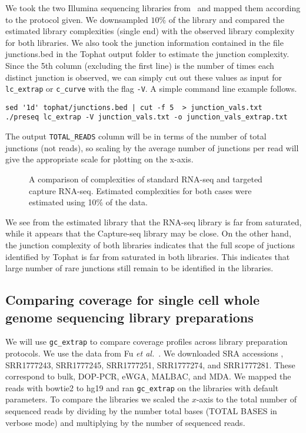 \documentclass[11pt, titlepage]{article}
\newcommand{\fn}[1]{\texttt{#1}}
\begin{document}
We took the two Illumina sequencing libraries
from~\cite{mercer2011targeted} and mapped them according to the
protocol given.  We downsampled $10 \%$ of the library and compared
the estimated library complexities (single end) with the observed
library complexity for both libraries.  We also took the junction
information contained in the file junctions.bed in the Tophat output
folder to estimate the junction complexity.  Since the 5th column
(excluding the first line) is the number of times each distinct
junction is observed, we can simply cut out these values as input for
\fn{lc\_extrap} or \fn{c\_curve} with the flag \fn{-V}.  A simple
command line example follows.
\begin{verbatim}
sed '1d' tophat/junctions.bed | cut -f 5  > junction_vals.txt
./preseq lc_extrap -V junction_vals.txt -o junction_vals_extrap.txt
\end{verbatim}
The output \fn{TOTAL\_READS} column will be in terms of the number of
total junctions (not reads), so scaling by the average number of
junctions per read will give the appropriate scale for plotting on the
x-axis.

\begin{figure}[h!]
\caption{A comparison of complexities of standard RNA-seq and
targeted capture RNA-seq.  Estimated complexities for both cases were
estimated using 10\% of the data.}
\end{figure}

We see from the estimated library that the RNA-seq library is far from
saturated, while it appears that the Capture-seq library may be close.
On the other hand, the junction complexity of both libraries indicates
that the full scope of juctions identified by Tophat is far from
saturated in both libraries.  This indicates that large number of rare
junctions still remain to be identified in the libraries.


\newpage

\subsection*{Comparing coverage for single cell whole genome sequencing library preparations}

We will use \fn{gc\_extrap} to compare coverage profiles across
library preparation protocols.  We use the data from Fu {\em et
  al.}~\cite{fu2015uniform}.  We downloaded SRA accessions ,
SRR1777243, SRR1777245, SRR1777251, SRR1777274, and SRR1777281.  These
correspond to bulk, DOP-PCR, eWGA, MALBAC, and MDA.  We mapped the
reads with bowtie2 to hg19 and ran \fn{gc\_extrap} on the libraries
with default parameters.  To compare the libraries we scaled the
$x$-axis to the total number of sequenced reads by dividing by the
number total bases (TOTAL BASES in verbose mode) and multiplying by
the number of sequenced reads.
\end{document}
